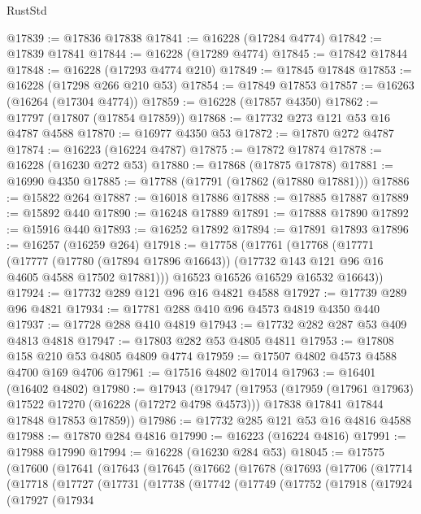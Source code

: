 \begin{lexlean}{RustStd}
\begin{coremodule}
@17839 := @17836 @17838
@17841 := @16228 (@17284 @4774)
@17842 := @17839 @17841
@17844 := @16228 (@17289 @4774)
@17845 := @17842 @17844
@17848 := @16228 (@17293 @4774 @210)
@17849 := @17845 @17848
@17853 := @16228 (@17298 @266 @210 @53)
@17854 := @17849 @17853
@17857 := @16263 (@16264 (@17304 @4774))
@17859 := @16228 (@17857 @4350)
@17862 := @17797 (@17807 (@17854 @17859))
@17868 := @17732 @273 @121 @53 @16 @4787 @4588
@17870 := @16977 @4350 @53
@17872 := @17870 @272 @4787
@17874 := @16223 (@16224 @4787)
@17875 := @17872 @17874
@17878 := @16228 (@16230 @272 @53)
@17880 := @17868 (@17875 @17878)
@17881 := @16990 @4350
@17885 := @17788 (@17791 (@17862 (@17880 @17881)))
@17886 := @15822 @264
@17887 := @16018 @17886
@17888 := @17885 @17887
@17889 := @15892 @440
@17890 := @16248 @17889
@17891 := @17888 @17890
@17892 := @15916 @440
@17893 := @16252 @17892
@17894 := @17891 @17893
@17896 := @16257 (@16259 @264)
@17918 := @17758
    (@17761
      (@17768
        (@17771
          (@17777
            (@17780 (@17894 @17896 @16643))
            (@17732 @143 @121 @96 @16 @4605 @4588 @17502 @17881)))
        @16523
        @16526
        @16529
        @16532
        @16643))
@17924 := @17732 @289 @121 @96 @16 @4821 @4588
@17927 := @17739 @289 @96 @4821
@17934 := @17781 @288 @410 @96 @4573 @4819 @4350 @440
@17937 := @17728 @288 @410 @4819
@17943 := @17732 @282 @287 @53 @409 @4813 @4818
@17947 := @17803 @282 @53 @4805 @4811
@17953 := @17808 @158 @210 @53 @4805 @4809 @4774
@17959 := @17507 @4802 @4573 @4588 @4700 @169 @4706
@17961 := @17516 @4802 @17014
@17963 := @16401 (@16402 @4802)
@17980 := @17943
    (@17947
      (@17953
        (@17959 (@17961 @17963) @17522 @17270 (@16228 (@17272 @4798 @4573)))
        @17838
        @17841
        @17844
        @17848
        @17853
        @17859))
@17986 := @17732 @285 @121 @53 @16 @4816 @4588
@17988 := @17870 @284 @4816
@17990 := @16223 (@16224 @4816)
@17991 := @17988 @17990
@17994 := @16228 (@16230 @284 @53)
@18045 := @17575
    (@17600
      (@17641
        (@17643
          (@17645
            (@17662
              (@17678
                (@17693
                  (@17706
                    (@17714
                      (@17718
                        (@17727
                          (@17731
                            (@17738
                              (@17742
                                (@17749
                                  (@17752
                                    (@17918
                                      (@17924
                                        (@17927
                                          (@17934

\end{coremodule}
\end{lexlean}

